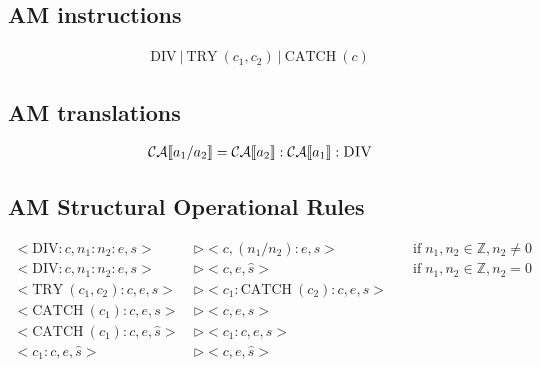 \documentclass[11pt,oneside,a4paper]{article}
\begin{document}
\subsection*{AM instructions}
\begin{align*}
\text{DIV}\: |\: \text{TRY}\:(c_1,c_2)\: |\: \text{CATCH}\:(c)
\end{align*}

\subsection*{AM translations}
\begin{align*}
\mathcal{CA}\llbracket a_1 / a_2 \rrbracket = 
    \mathcal{CA}\llbracket a_2 \rrbracket:
    \mathcal{CA}\llbracket a_1 \rrbracket:\textsc{DIV}
\end{align*}

\subsection*{AM Structural Operational Rules}
\begingroup
\addtolength{\jot}{.5em}
\begin{align*}
<\text{DIV}:c, n_1:n_2:e, s> \: &\triangleright <c, (n_1 / n_2):e, s>& \quad 
\text{if} \; n_1, n_2 \in \mathbb{Z}, n_2 \neq 0 \\
<\text{DIV}:c, n_1:n_2:e, s> \: &\triangleright <c, e, \hat{s}>& \quad
\text{if} \; n_1, n_2 \in \mathbb{Z}, n_2 = 0 \\
<\text{TRY}\:(c_1, c_2):c, e, s> \: &\triangleright 
<c_1:\text{CATCH}\:(c_2):c, e, s>& \\
<\text{CATCH}\:(c_1):c, e, s>\: &\triangleright <c, e, s>& \\
<\text{CATCH}\:(c_1):c, e, \hat{s}>\: &\triangleright <c_1:c, e, s>& \\
<c_1:c, e, \hat{s}>\: &\triangleright <c, e, \hat{s}>&
\end{align*}
\endgroup
\end{document}

